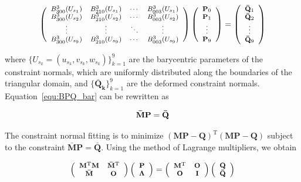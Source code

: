 \documentclass[3p]{elsarticle}
\begin{document}
\begin{equation}
	\footnotesize
		\left(
		\begin{array}{cccc}
		B^3_{300}(U_{s_1}) & B^3_{210}(U_{s_1}) & \cdots & B^3_{003}(U_{s_1}) \\
		B^3_{300}(U_{s_2}) & B^3_{210}(U_{s_2}) & \cdots & B^3_{003}(U_{s_2}) \\
		\vdots & \vdots & \ddots & \vdots \\
		B^3_{300}(U_{s_9}) & B^3_{210}(U_{s_9}) & \cdots & B^3_{003}(U_{s_9}) \\
		\end{array}
		\right)
		\left(
		\begin{array}{c}
		\mathbf P_0 \\
		\mathbf P_1 \\
		\vdots \\
		\mathbf P_9
		\end{array}
		\right)
		=
		\left(
		\begin{array}{c}
		\mathbf {\bar Q}_1 \\
		\mathbf {\bar Q}_2 \\
		\vdots \\
		\mathbf {\bar Q}_9
		\end{array}
		\right)
	\label{equ:BPQ_bar}
\end{equation}

\noindent where $\{U_{s_k}=(u_{s_k},v_{s_k},w_{s_k})\}_{k=1}^9$ are the barycentric parameters of the constraint normals,
which are uniformly distributed along the boundaries of the triangular domain, and $\{\mathbf{\bar Q_k}\}_{k=1}^9 $ are
the deformed constraint normals. Equation~\ref{equ:BPQ_bar} can be rewritten as

\begin{equation}
	\footnotesize
	\mathbf{\bar M} \mathbf P=\mathbf{\bar Q}
\end{equation}

The constraint normal fitting is to minimize $(\mathbf M \mathbf P - \mathbf Q)^{\mathrm T}(\mathbf M \mathbf P -
\mathbf Q)$ subject to the constraint $\mathbf{\bar M} \mathbf P=\mathbf{\bar Q}$. Using the method of Lagrange
multipliers, we obtain

\begin{equation}
	\footnotesize
	\left(
		\begin{array}{cc}
			\mathbf M^{\mathrm T}\mathbf M & \mathbf{\bar M}^{\mathrm T} \\
			\mathbf{\bar M} & \mathbf O
		\end{array}
	\right)
	\left(
		\begin{array}{c}
			\mathbf P\\
			\bm{\Lambda}
		\end{array}
	\right)
	=
	\left(
		\begin{array}{cc}
			\mathbf M^{\mathrm T}& \mathbf O\\
			\mathbf O &\mathbf I
		\end{array}
	\right)
	\left(
		\begin{array}{c}
			\mathbf Q\\
			\mathbf {\bar Q}
		\end{array}
	\right)
	\label{equ:lagrange}
\end{equation}
\end{document}
